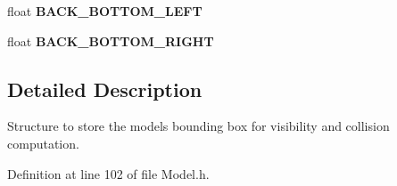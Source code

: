 \begin{DoxyCompactItemize}
\item 
float {\bfseries B\+A\+C\+K\+\_\+\+B\+O\+T\+T\+O\+M\+\_\+\+L\+E\+FT}\hypertarget{struct_model_1_1_b_o_u_n_d_i_n_g___b_o_x_af4c6ec7fac905c1ff6c2eeccc8272b7f}{}\label{struct_model_1_1_b_o_u_n_d_i_n_g___b_o_x_af4c6ec7fac905c1ff6c2eeccc8272b7f}

\item 
float {\bfseries B\+A\+C\+K\+\_\+\+B\+O\+T\+T\+O\+M\+\_\+\+R\+I\+G\+HT}\hypertarget{struct_model_1_1_b_o_u_n_d_i_n_g___b_o_x_af638a06a328c69636b4e261a10940d1e}{}\label{struct_model_1_1_b_o_u_n_d_i_n_g___b_o_x_af638a06a328c69636b4e261a10940d1e}

\end{DoxyCompactItemize}


\subsection{Detailed Description}
Structure to store the models bounding box for visibility and collision computation. 

Definition at line 102 of file Model.\+h.

